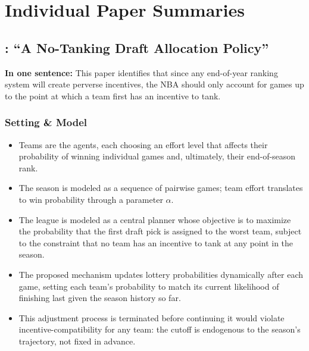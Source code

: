 \documentclass{article}
\begin{document}
\section{Individual Paper Summaries}
\label{app:paper_summaries}

\subsection{\citet{banchio2020}: ``A No-Tanking Draft Allocation Policy''}

\textbf{In one sentence:} This paper identifies that since any end-of-year
ranking system will create perverse incentives, the NBA should only account
for games up to the point at which a team first has an incentive to tank.

\subsubsection*{Setting \& Model}
\begin{itemize}
    \item Teams are the agents, each choosing an effort level that affects
    their probability of winning individual games and, ultimately, their
    end-of-season rank.
    \item The season is modeled as a sequence of pairwise games; team effort
    translates to win probability through a parameter $\alpha$.
    \item The league is modeled as a central planner whose objective is to
    maximize the probability that the first draft pick is assigned to the
    worst team, subject to the constraint that no team has an incentive to
    tank at any point in the season.
    \item The proposed mechanism updates lottery probabilities dynamically
    after each game, setting each team's probability to match its current
    likelihood of finishing last given the season history so far.
    \item This adjustment process is terminated before continuing it would
    violate incentive-compatibility for any team: the cutoff is endogenous to
    the season's trajectory, not fixed in advance.
\end{itemize}
\end{document}
